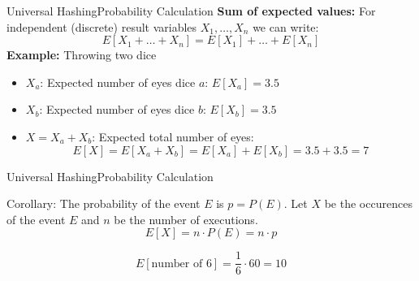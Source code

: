 
\begin{frame}{Universal Hashing}{Probability Calculation}
  \textbf{Sum of expected values:}
  For independent (discrete) result variables {\color{Mittel-Blau}$X_1,\dots,X_n$} we can write:
    {\color{Mittel-Blau}\[E\left[X_1+\dots+X_n\right]
      = E[X_1] + \dots + E[X_n]\]}
  \textbf{Example:} Throwing two dice
  \begin{itemize}
    \item
      {\color{Mittel-Blau}$X_a$}: Expected number of eyes dice {\color{Mittel-Blau}$a$}: {\color{Mittel-Blau}$E[X_a] = 3.5$}
    \item
      {\color{Mittel-Blau}$X_b$}: Expected number of eyes dice {\color{Mittel-Blau}$b$}: {\color{Mittel-Blau}$E[X_b] = 3.5$}
    \item
      {\color{Mittel-Blau}$X = X_a + X_b$}: Expected total number of eyes:
      {\color{Mittel-Blau}\[E[X]
        = E[X_a + X_b]
        = E[X_a] + E[X_b] = 3.5 + 3.5 = 7\]}
  \end{itemize}
\end{frame}


\begin{frame}{Universal Hashing}{Probability Calculation}
  \begin{block}{Corollary:}
    The probability of the event $E$ is $p = P(E)$.
    Let $X$ be the occurences of the event $E$ and $n$ be the number
    of executions.
    {\color{Mittel-Blau}\[E[X] = n \cdot P(E) = n \cdot p\]}
  \end{block}
  \begin{example}
    \[E\left[\text{number of 6}\right] = \frac{1}{6} \cdot 60 = 10\]
  \end{example}
\end{frame}


